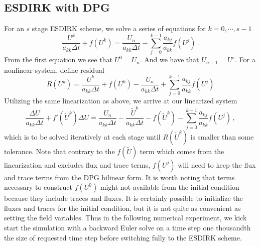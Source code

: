 \documentclass[Proposal.tex]{subfiles}
\begin{document}
\subsection{ESDIRK with DPG}
For an $s$ stage ESDIRK scheme, we solve a series of equations for $k=0,\cdots,s-1$
\begin{equation*}
\frac{U^k}{a_{kk}\Delta t}+f(U^k)=\frac{U_n}{a_{kk}\Delta
t}-\sum_{j=0}^{k-1}\frac{a_{kj}}{a_{kk}}f(U^j)\,.
\end{equation*}
From the first equation we see that $U^0=U_n$. And we have that $U_{n+1}=U^s$.
For a nonlinear system, define residual
\[
R(U^k) =
\frac{U^k}{a_{kk}\Delta t}+f(U^k)-\frac{U_n}{a_{kk}\Delta
t}+\sum_{j=0}^{k-1}\frac{a_{kj}}{a_{kk}}f(U^j)
\]
Utilizing the same linearization as above, we arrive at our linearized system
\begin{equation}
	\label{eq:ESDIRKScheme}
	\frac{\Delta U}{a_{kk}\Delta t}+f'(\tilde U^k)\Delta U
	=\frac{U_n}{a_{kk}\Delta t}-\frac{\tilde U^k}{a_{kk}\Delta t}-f(\tilde U^k)
	-\sum_{j=0}^{k-1}\frac{a_{kj}}{a_{kk}}f(U^j)\,,
	\end{equation}
which is to be solved iteratively at each stage until $R(\tilde U^k)$ is smaller than some tolerance.
Note that contrary to the $f(\tilde U)$ term which comes from the linearization and excludes flux and trace terms,
$f(U^j)$ will need to keep the flux and trace terms from the DPG bilinear form.
It is worth noting that terms necessary to construct $f(U^0)$ might not available from the initial condition because they include traces and fluxes.
It is certainly possible to initialize the fluxes and traces for the initial condition, but it is not quite as convenient as setting the field variables.
Thus in the following numerical experiment, we kick start the simulation with a backward Euler solve on a time step one thousandth the size of requested time step before switching fully to the ESDIRK scheme.

\end{document}
